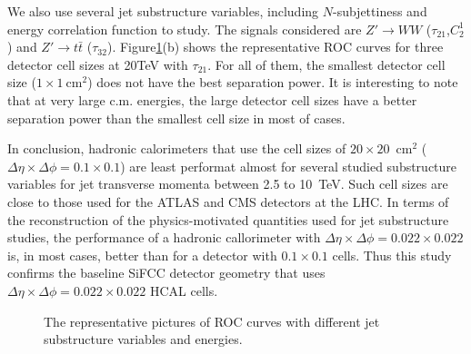\documentclass[a4paper]{PoS}
\begin{document}
We also use several jet substructure variables, including $N$-subjettiness\cite{Thaler:2010tr} and energy correlation function\cite{Larkoski:2013eya} to study. The signals considered are $Z'\rightarrow WW$ ($\tau_{21}$,$C_2^1$) and $Z' \rightarrow t\bar{t}$ ($\tau_{32}$). Figure\ref{1}(b) shows the representative ROC curves for three detector cell sizes at 20TeV with $\tau_{21}$. For all of them, the smallest detector cell size ($1\times1~\mathrm{cm}^2$) does not have the best separation power. It is interesting to note that at very large c.m. energies, the large detector cell sizes have a better separation power than the smallest cell size in most of cases. 



In conclusion, hadronic calorimeters that use the cell sizes of $20\times 20$~cm$^2$ ($\Delta \eta \times \Delta \phi = 0.1\times0.1$) 
are least performat almost for several studied 
substructure variables for jet transverse momenta between 2.5 to 10~TeV. 
Such cell sizes are close to 
those used for the ATLAS and CMS detectors at the LHC. 
In terms of the reconstruction of the physics-motivated quantities  
used for jet substructure studies, the  performance 
of a  hadronic callorimeter  with 
$\Delta \eta \times \Delta \phi = 0.022\times0.022$ is, in most cases,
better than for a detector with  $0.1\times0.1$ cells.
Thus this study confirms the  baseline SiFCC detector geometry \cite{Chekanov:2016ppq}
that uses $\Delta \eta \times \Delta \phi = 0.022\times0.022$ HCAL cells.


\begin{figure}
\begin{center}
\end{center}
\caption{The representative pictures of ROC curves with different jet substructure variables and energies.}
\label{1}
\end{figure}
\end{document}
